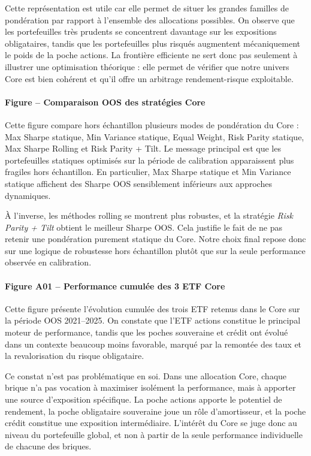 \documentclass{article}
\begin{document}
Cette représentation est utile car elle permet de situer les grandes familles de pondération par rapport à l’ensemble des allocations possibles. On observe que les portefeuilles très prudents se concentrent davantage sur les expositions obligataires, tandis que les portefeuilles plus risqués augmentent mécaniquement le poids de la poche actions. La frontière efficiente ne sert donc pas seulement à illustrer une optimisation théorique : elle permet de vérifier que notre univers Core est bien cohérent et qu’il offre un arbitrage rendement-risque exploitable.

\paragraph{Figure -- Comparaison OOS des stratégies Core}
Cette figure compare hors échantillon plusieurs modes de pondération du Core : Max Sharpe statique, Min Variance statique, Equal Weight, Risk Parity statique, Max Sharpe Rolling et Risk Parity + Tilt. Le message principal est que les portefeuilles statiques optimisés sur la période de calibration apparaissent plus fragiles hors échantillon. En particulier, Max Sharpe statique et Min Variance statique affichent des Sharpe OOS sensiblement inférieurs aux approches dynamiques.

À l’inverse, les méthodes rolling se montrent plus robustes, et la stratégie \textit{Risk Parity + Tilt} obtient le meilleur Sharpe OOS. Cela justifie le fait de ne pas retenir une pondération purement statique du Core. Notre choix final repose donc sur une logique de robustesse hors échantillon plutôt que sur la seule performance observée en calibration.

\paragraph{Figure A01 -- Performance cumulée des 3 ETF Core}
Cette figure présente l’évolution cumulée des trois ETF retenus dans le Core sur la période OOS 2021--2025. On constate que l’ETF actions constitue le principal moteur de performance, tandis que les poches souveraine et crédit ont évolué dans un contexte beaucoup moins favorable, marqué par la remontée des taux et la revalorisation du risque obligataire.

Ce constat n’est pas problématique en soi. Dans une allocation Core, chaque brique n’a pas vocation à maximiser isolément la performance, mais à apporter une source d’exposition spécifique. La poche actions apporte le potentiel de rendement, la poche obligataire souveraine joue un rôle d’amortisseur, et la poche crédit constitue une exposition intermédiaire. L’intérêt du Core se juge donc au niveau du portefeuille global, et non à partir de la seule performance individuelle de chacune des briques.
\end{document}
